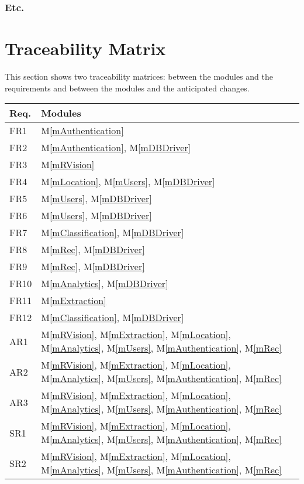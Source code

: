 \documentclass[12pt, titlepage]{article}
\newcommand{\mref}[1]{M\ref{#1}}
\begin{document}
\subsubsection{Etc.}

\section{Traceability Matrix} \label{SecTM}

This section shows two traceability matrices: between the modules and the
requirements and between the modules and the anticipated changes.

\begin{longtable}{p{} p{}}
\toprule
\textbf{Req.} & \textbf{Modules}\\
\midrule
FR1 & \mref{mAuthentication}\\
FR2 & \mref{mAuthentication}, \mref{mDBDriver}\\
FR3 & \mref{mRVision}\\
FR4 & \mref{mLocation}, \mref{mUsers}, \mref{mDBDriver}\\
FR5 & \mref{mUsers}, \mref{mDBDriver}\\
FR6 & \mref{mUsers}, \mref{mDBDriver}\\
FR7 & \mref{mClassification}, \mref{mDBDriver}\\
FR8 & \mref{mRec}, \mref{mDBDriver}\\
FR9 & \mref{mRec}, \mref{mDBDriver}\\
FR10 & \mref{mAnalytics}, \mref{mDBDriver}\\
FR11 & \mref{mExtraction}\\
FR12 & \mref{mClassification}, \mref{mDBDriver}\\
AR1 & \mref{mRVision}, \mref{mExtraction}, \mref{mLocation}, \mref{mAnalytics}, \mref{mUsers}, \mref{mAuthentication}, \mref{mRec}\\
AR2 & \mref{mRVision}, \mref{mExtraction}, \mref{mLocation}, \mref{mAnalytics}, \mref{mUsers}, \mref{mAuthentication}, \mref{mRec}\\
AR3 & \mref{mRVision}, \mref{mExtraction}, \mref{mLocation}, \mref{mAnalytics}, \mref{mUsers}, \mref{mAuthentication}, \mref{mRec}\\
SR1 & \mref{mRVision}, \mref{mExtraction}, \mref{mLocation}, \mref{mAnalytics}, \mref{mUsers}, \mref{mAuthentication}, \mref{mRec}\\
SR2 & \mref{mRVision}, \mref{mExtraction}, \mref{mLocation}, \mref{mAnalytics}, \mref{mUsers}, \mref{mAuthentication}, \mref{mRec}\\

\end{longtable}
\end{document}
